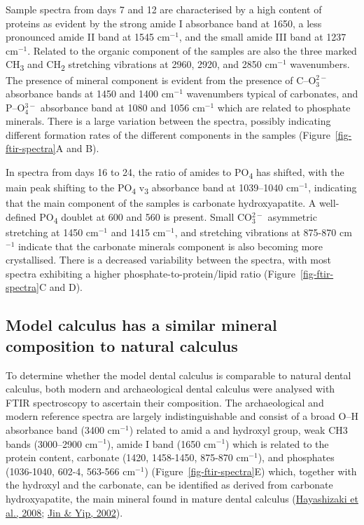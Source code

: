 \documentclass[
  letterpaper,
]{book}
\begin{document}
Sample spectra from days 7 and 12 are characterised by a high content of
proteins as evident by the strong amide I absorbance band at 1650, a
less pronounced amide II band at 1545 cm\(^{-1}\), and the small amide
III band at 1237 cm\(^{-1}\). Related to the organic component of the
samples are also the three marked CH\textsubscript{3} and
CH\textsubscript{2} stretching vibrations at 2960, 2920, and 2850
cm\(^{-1}\) wavenumbers. The presence of mineral component is evident
from the presence of C--O\(^{2-}_3\) absorbance bands at 1450 and 1400
cm\(^{-1}\) wavenumbers typical of carbonates, and P--O\(^{3-}_4\)
absorbance band at 1080 and 1056 cm\(^{-1}\) which are related to
phosphate minerals. There is a large variation between the spectra,
possibly indicating different formation rates of the different
components in the samples (Figure~\ref{fig-ftir-spectra}A and B).

In spectra from days 16 to 24, the ratio of amides to
PO\textsubscript{4} has shifted, with the main peak shifting to the
PO\textsubscript{4} v\textsubscript{3} absorbance band at 1039--1040
cm\(^{-1}\), indicating that the main component of the samples is
carbonate hydroxyapatite. A well-defined PO\textsubscript{4} doublet at
600 and 560 is present. Small CO\(_3^{2-}\) asymmetric stretching at
1450 cm\(^{-1}\) and 1415 cm\(^{-1}\), and stretching vibrations at
875-870 cm\(^{-1}\) indicate that the carbonate minerals component is
also becoming more crystallised. There is a decreased variability
between the spectra, with most spectra exhibiting a higher
phosphate-to-protein/lipid ratio (Figure~\ref{fig-ftir-spectra}C and D).

\hypertarget{model-calculus-has-a-similar-mineral-composition-to-natural-calculus}{%
\subsection{Model calculus has a similar mineral composition to natural
calculus}\label{model-calculus-has-a-similar-mineral-composition-to-natural-calculus}}

To determine whether the model dental calculus is comparable to natural
dental calculus, both modern and archaeological dental calculus were
analysed with FTIR spectroscopy to ascertain their composition. The
archaeological and modern reference spectra are largely
indistinguishable and consist of a broad O--H absorbance band (3400
cm\(^{-1}\)) related to amid a and hydroxyl group, weak CH3 bands
(3000--2900 cm\(^{-1}\)), amide I band (1650 cm\(^{-1}\)) which is
related to the protein content, carbonate (1420, 1458-1450, 875-870
cm\(^{-1}\)), and phosphates (1036-1040, 602-4, 563-566 cm\(^{-1}\))
(Figure~\ref{fig-ftir-spectra}E) which, together with the hydroxyl and
the carbonate, can be identified as derived from carbonate
hydroxyapatite, the main mineral found in mature dental calculus
(\protect\hyperlink{ref-hayashizakiSiteSpecific2008}{Hayashizaki et al.,
2008}; \protect\hyperlink{ref-jinSupragingivalCalculus2002}{Jin \& Yip,
2002}).
\end{document}
